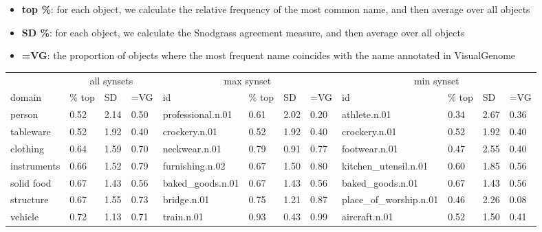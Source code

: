 \documentclass[11pt,a4paper]{article}
\begin{document}
\begin{itemize}
\item \textbf{top \%}: for each object, we calculate the relative frequency of the most common name, and then average over all objects
\item \textbf{SD \%}: for each object, we calculate the Snodgrass agreement measure, and then average over all objects
\item \textbf{=VG}: the proportion of objects where the most frequent name coincides with the name annotated in VisualGenome
\end{itemize}


\begin{table}
\small
\begin{tabular}{llll|llll|llll}
\toprule
    & \multicolumn{3}{c|}{all synsets} & \multicolumn{4}{c|}{max synset} & \multicolumn{4}{c}{min synset} \\
                         domain & \% top &    SD &   =VG &         id &     \% top &    SD &   =VG &             id &     \% top &    SD &   =VG \\
\midrule
                           person &  0.52 &  2.14 &  0.50 &  professional.n.01 &  0.61 &  2.02 &  0.20 &           athlete.n.01 &  0.34 &  2.67 &  0.36 \\
                        tableware &  0.52 &  1.92 &  0.40 &      crockery.n.01 &  0.52 &  1.92 &  0.40 &          crockery.n.01 &  0.52 &  1.92 &  0.40 \\
              clothing &  0.64 &  1.59 &  0.70 &      neckwear.n.01 &  0.79 &  0.91 &  0.77 &          footwear.n.01 &  0.47 &  2.55 &  0.40 \\
 instruments &  0.66 &  1.52 &  0.79 &    furnishing.n.02 &  0.67 &  1.50 &  0.80 &   kitchen\_utensil.n.01 &  0.60 &  1.85 &  0.56 \\
                solid food &  0.67 &  1.43 &  0.56 &   baked\_goods.n.01 &  0.67 &  1.43 &  0.56 &       baked\_goods.n.01 &  0.67 &  1.43 &  0.56 \\
          structure &  0.67 &  1.55 &  0.73 &        bridge.n.01 &  0.75 &  1.21 &  0.87 &  place\_of\_worship.n.01 &  0.46 &  2.26 &  0.08 \\
                          vehicle &  0.72 &  1.13 &  0.71 &         train.n.01 &  0.93 &  0.43 &  0.99 &          aircraft.n.01 &  0.52 &  1.50 &  0.41 \\

\end{tabular}
\end{table}
\end{document}
